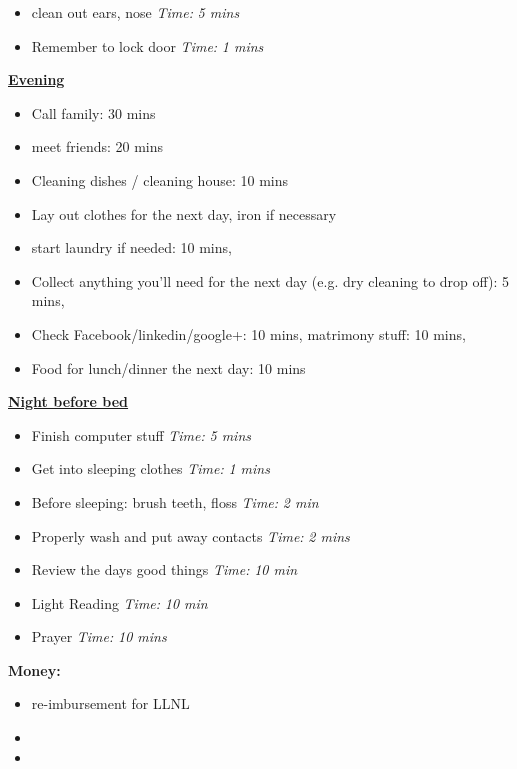 \documentclass[11pt]{article}
\newcommand{\timeEst}[1]{\textit{Time:} \textit{#1}}
\begin{document}
{\begin{itemize}
                \item \tiny clean out ears, nose \timeEst{5 mins}
                \item \tiny Remember to lock door \timeEst{1 mins}
                \end{itemize}                 
                \underline{\textbf{Evening}}
                \begin{itemize}
                  \tiny \item \tiny Call family: 30 mins
                \item \tiny meet friends: 20 mins
                \item \tiny Cleaning dishes / cleaning house: 10 mins
                \item \tiny Lay out clothes for the next day, iron if necessary
                \item \tiny start laundry if needed: 10 mins,
                \item \tiny Collect anything you’ll need for the next day (e.g. dry cleaning to drop off): 5 mins,
                \item \tiny Check Facebook/linkedin/google+: 10 mins, matrimony stuff: 10 mins,
                \item \tiny Food for lunch/dinner the next day: 10 mins
                \end{itemize}

                \underline{\textbf{Night before bed}}
                \begin{itemize}
                  \tiny \item \tiny Finish computer stuff \timeEst{5 mins}
                \item \tiny Get into sleeping clothes \timeEst{1 mins}
                \item \tiny Before sleeping: brush teeth, floss \timeEst{ 2 min}
                \item \tiny Properly wash and put away contacts \timeEst{ 2 mins}
                \item \tiny Review the days good things \timeEst{ 10 min}
                \item \tiny Light Reading \timeEst{ 10 min}
                \item \tiny Prayer \timeEst{10 mins}
            \end{itemize} 
            \newpage
            
            \textbf{Money:}\\ 
            \begin{itemize} 
              \tiny \item \tiny re-imbursement for LLNL 
            \item \tiny 
            \item \tiny 
            \end{itemize} 

}
\end{document}
